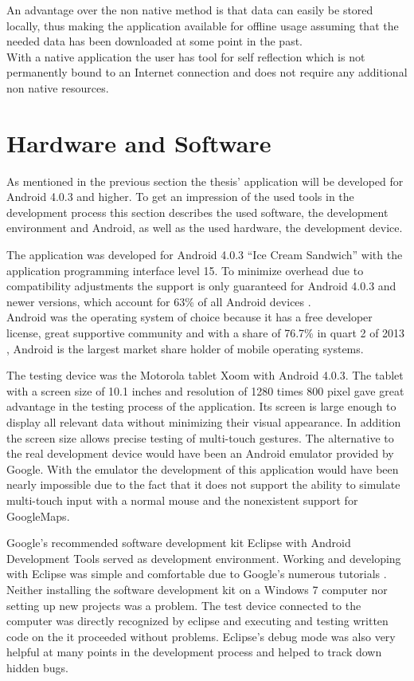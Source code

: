 An advantage over the non native method is that data can easily be stored locally, thus making the application available for offline usage assuming that the needed data has been downloaded at some point in the past.\\
With a native application the user has tool for self reflection which is not permanently bound to an Internet connection and does not require any additional non native resources.
\section{Hardware and Software}
As mentioned in the previous section the thesis' application will be developed for Android 4.0.3 and higher. To get an impression of the used tools in the development process this section describes the used software, the development environment and Android, as well as the used hardware, the development device.

The  application was developed for Android 4.0.3 ``Ice Cream Sandwich'' with the application programming interface level 15. To minimize overhead due to compatibility adjustments the support is only guaranteed for Android 4.0.3 and newer versions, which account for 63\% of all Android devices \cite{androidversionpercent}.\\
Android was the operating system of choice because it has a free developer license, great supportive community and with a share of 76.7\% in quart 2 of 2013 \cite{androidpercent}, Android is the largest market share holder of mobile operating systems.

The testing device was the Motorola tablet Xoom with Android 4.0.3. The tablet with a screen size of 10.1 inches and resolution of 1280 times 800 pixel gave great advantage in the testing process of the application. Its screen is large enough to display all relevant data without minimizing their visual appearance. In addition the screen size allows precise testing of multi-touch gestures. The alternative to the real development device would have been an Android emulator provided by Google. With the emulator the development of this application would have been nearly impossible due to the fact that it does not support the ability to simulate multi-touch input with a normal mouse and the nonexistent support for GoogleMaps.

Google's  recommended software development kit Eclipse with Android Development Tools served as development environment. Working and developing with Eclipse was simple and comfortable due to Google's numerous tutorials \cite{androidtutorials}. Neither installing the software development kit on a Windows 7 computer nor setting up new projects was a problem. %
The test device connected to the computer was directly recognized by eclipse and executing and testing written code on the it proceeded without problems. Eclipse's debug mode was also very helpful at many points in the development process and helped to track down hidden bugs.

